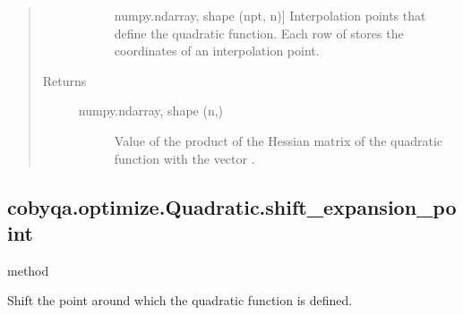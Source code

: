 \documentclass[letterpaper,10pt,english]{sphinxmanual}
\begin{document}
\begin{fulllineitems}
\begin{fulllineitems}
\begin{quote}
\begin{description}
\begin{description}
\item[{}] \leavevmode{[}numpy.ndarray, shape (npt, n){]}
\sphinxAtStartPar
Interpolation points that define the quadratic function. Each row of
 stores the coordinates of an interpolation point.

\end{description}

\item[{Returns}] \leavevmode\begin{description}
\item[{numpy.ndarray, shape (n,)}] \leavevmode
\sphinxAtStartPar
Value of the product of the Hessian matrix of the quadratic function
with the vector .

\end{description}

\end{description}\end{quote}

\end{fulllineitems}



\subsection{cobyqa.optimize.Quadratic.shift\_expansion\_point}
\label{\detokenize{refs/generated/cobyqa.optimize.Quadratic.shift_expansion_point:cobyqa-optimize-quadratic-shift-expansion-point}}\label{\detokenize{refs/generated/cobyqa.optimize.Quadratic.shift_expansion_point::doc}}
\sphinxAtStartPar
method

\begin{fulllineitems}
\label{\detokenize{refs/generated/cobyqa.optimize.Quadratic.shift_expansion_point:cobyqa.optimize.Quadratic.shift_expansion_point}}
\sphinxAtStartPar
Shift the point around which the quadratic function is defined.


\end{fulllineitems}
\end{fulllineitems}
\end{document}
